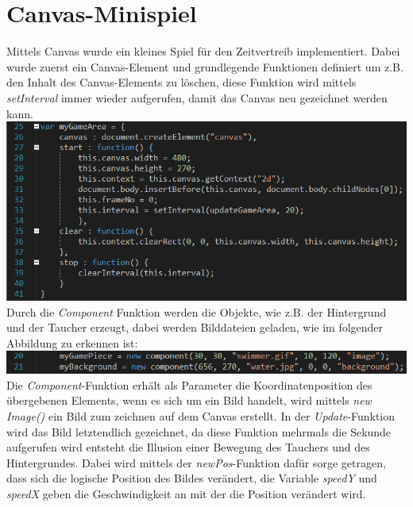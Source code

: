 \section{Canvas-Minispiel}
Mittels Canvas wurde ein kleines Spiel f\"ur den Zeitvertreib implementiert. Dabei wurde zuerst ein Canvas-Element und grundlegende Funktionen definiert um z.B. den Inhalt des Canvas-Elements zu löschen, diese Funktion wird mittels \textit{setInterval} immer wieder aufgerufen, damit das Canvas neu gezeichnet werden kann.     
\newline
\includegraphics[width=1\textwidth]{img/vincent/abb04.png}
\newline
Durch die \textit{Component} Funktion werden die Objekte, wie z.B. der Hintergrund und der Taucher erzeugt, dabei werden Bilddateien geladen, wie im folgender Abbildung zu erkennen ist: 
\newline
\includegraphics[width=1\textwidth]{img/vincent/abb05.png}
\newline
Die \textit{Component}-Funktion erh\"alt als Parameter die Koordinatenposition des \"ubergebenen Elements, wenn es sich um ein Bild handelt, wird mittels \textit{new Image()} ein Bild zum zeichnen auf dem Canvas erstellt. In der \textit{Update}-Funktion wird das Bild letztendlich gezeichnet, da diese Funktion mehrmals die Sekunde aufgerufen wird entsteht die Illusion einer Bewegung des Tauchers und des Hintergrundes. Dabei wird mittels der \textit{newPos}-Funktion daf\"ur sorge getragen, dass sich die logische Position des Bildes ver\"andert, die Variable \textit{speedY} und \textit{speedX} geben die Geschwindigkeit an mit der die Position ver\"andert wird. 
\newline
